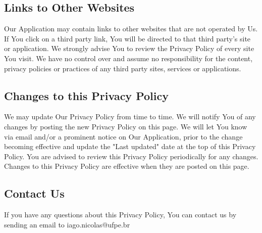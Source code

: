 \documentclass{article}
\begin{document}
\subsection*{Links to Other Websites}
Our Application may contain links to other websites that are not operated by Us. If You click on a third party link, You will be directed to that third party's site or application. We strongly advise You to review the Privacy Policy of every site You visit.\newline
We have no control over and assume no responsibility for the content, privacy policies or practices of any third party sites, services or applications.\newline
\subsection*{Changes to this Privacy Policy}
We may update Our Privacy Policy from time to time. We will notify You of any changes by posting the new Privacy Policy on this page.\newline
We will let You know via email and/or a prominent notice on Our Application, prior to the change becoming effective and update the "Last updated" date at the top of this Privacy Policy.\newline
You are advised to review this Privacy Policy periodically for any changes. Changes to this Privacy Policy are effective when they are posted on this page.\newline
\subsection*{Contact Us}
If you have any questions about this Privacy Policy, You can contact us by sending an email to iago.nicolas@ufpe.br
\end{document}
